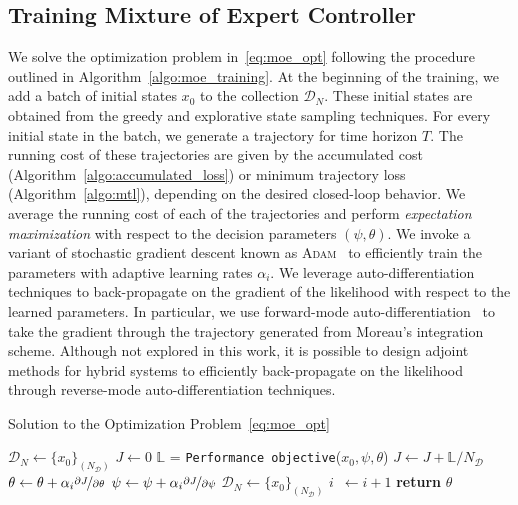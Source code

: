 \subsection{Training Mixture of Expert Controller}
\label{ssec:training_moe}

%
We solve the optimization problem in~\eqref{eq:moe_opt} following the procedure
outlined in Algorithm~\eqref{algo:moe_training}.
%
At the beginning of the training, we add a batch of initial states $x_0$ to the
collection $\mathcal{D}_N$. These initial states are obtained from the greedy
and explorative state sampling techniques. 
%
For every initial state in the batch, we generate a trajectory for time horizon $T$.
%
The running cost of these trajectories are given by the accumulated cost
(Algorithm~\eqref{algo:accumulated_loss}) or minimum trajectory loss
(Algorithm~\eqref{algo:mtl}), depending on the desired closed-loop behavior. 
%
We average the running cost of each of the trajectories and perform
\textit{expectation maximization} with respect to the decision parameters
$(\psi, \theta)$.
%
We invoke a variant of stochastic gradient descent known as
\textsc{Adam}~\cite{kingma2014adam} to efficiently train the parameters with
adaptive learning rates $\alpha_i$.
%
We leverage auto-differentiation techniques to back-propagate on the gradient of
the likelihood with respect to the learned parameters.
%
In particular, we use forward-mode auto-differentiation~\cite{revels2016forward}
to take the gradient through the trajectory generated from Moreau's integration
scheme.
%
Although not explored in this work, it is possible to design adjoint methods for
hybrid systems to efficiently back-propagate on the likelihood through
reverse-mode auto-differentiation techniques.
%
\begin{algorithm}[tb]
      \caption{Solution to the Optimization Problem~\eqref{eq:moe_opt}}
      \label{algo:moe_training}
      \small
      \begin{algorithmic}[1]
          \algrenewcommand\algorithmicindent{0em} %
          \State $\mathcal{D}_N \gets \{x_0\}_{(N_{\mathcal{D}})}$   
          \algrenewcommand\algorithmicindent{1.1em} %
          \State $J \gets 0$
              \State $\mathbb{L}$ = \texttt{Performance objective}($x_0, \psi, \theta$) 
              \State $J \gets J + \mathbb{L}/N_{\mathcal{D}}$ 
          \EndFor
          \State $\theta \gets \theta + \alpha_i \nicefrac{\partial J}{\partial \theta}$
          \State $\psi \gets \psi + \alpha_i \nicefrac{\partial J}{\partial \psi}$
          \State $\mathcal{D}_N \gets \{x_0\}_{(N_{\mathcal{D}})}$
          \State $i \;\:\gets i + 1$
          \EndWhile
          \State \textbf{return} $\theta$
      \end{algorithmic}
  \end{algorithm}

